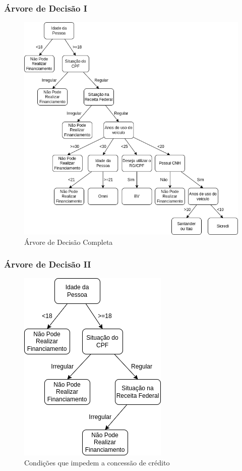 \documentclass[12pt]{beamer}
\begin{document}
\begin{frame}
    \frametitle{Árvore de Decisão I}
    
    \begin{figure}[!h]
        \centering
        \includegraphics[height=.67\textheight]{arvore_completa.png}
        \caption{Árvore de Decisão Completa}
    \end{figure}
\end{frame}
\begin{frame}
    \frametitle{Árvore de Decisão II}
    \begin{figure}[!h]
        \centering
        \includegraphics[height=.70\textheight]{condicoes_nao_aprova.png}
        \caption{Condições que impedem a concessão de crédito}
    \end{figure}
\end{frame}
\end{document}
